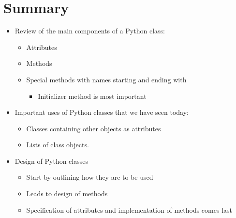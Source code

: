 \documentclass[letterpaper,10pt,english]{sphinxmanual}
\begin{document}
\section{Summary}
\label{\detokenize{lecture_notes/lec19_classes2:summary}}\begin{itemize}
\item {} 
Review of the main components of a Python class:
\begin{itemize}
\item {} 
Attributes

\item {} 
Methods

\item {} 
Special methods with names starting and ending with \sphinxcode{\sphinxupquote{\_\_}}
\begin{itemize}
\item {} 
Initializer method is most important

\end{itemize}

\end{itemize}

\item {} 
Important uses of Python classes that we have seen today:
\begin{itemize}
\item {} 
Classes containing other objects as attributes

\item {} 
Lists of class objects.

\end{itemize}

\item {} 
Design of Python classes
\begin{itemize}
\item {} 
Start by outlining how they are to be used

\item {} 
Leads to design of methods

\item {} 
Specification of attributes and implementation of methods comes
last

\end{itemize}

\end{itemize}
\end{document}
